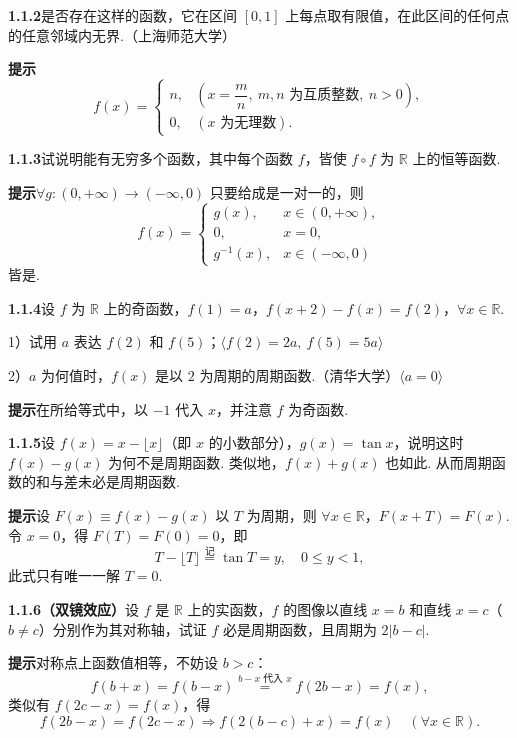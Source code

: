 \documentclass[UTF8,12pt,a4paper,fontset=fandol]{ctexart}
\begin{document}
\noindent\textbf{1.1.2}\quad 是否存在这样的函数，它在区间 $[0,1]$ 上每点取有限值，在此区间的任何点的任意邻域内无界.（上海师范大学）

\noindent\textbf{提示}\quad
\[
f(x)=
\begin{cases}
n, & \left(x=\dfrac mn,\ m,n\text{ 为互质整数},\ n>0\right),\\
0, & (x\text{ 为无理数}).
\end{cases}
\]

\noindent\textbf{1.1.3}\quad 试说明能有无穷多个函数，其中每个函数 $f$，皆使 $f\circ f$ 为 $\mathbb{R}$ 上的恒等函数.

\noindent\textbf{提示}\quad $\forall g:(0,+\infty)\to(-\infty,0)$ 只要给成是一对一的，则
\[
f(x)=
\begin{cases}
g(x), & x\in(0,+\infty),\\
0, & x=0,\\
g^{-1}(x), & x\in(-\infty,0)
\end{cases}
\]
皆是.

\noindent\textbf{1.1.4}\quad 设 $f$ 为 $\mathbb{R}$ 上的奇函数，$f(1)=a$，$f(x+2)-f(x)=f(2)$，$\forall x\in\mathbb{R}$.

1）试用 $a$ 表达 $f(2)$ 和 $f(5)$；\hfill $\langle f(2)=2a,\ f(5)=5a\rangle$

2）$a$ 为何值时，$f(x)$ 是以 $2$ 为周期的周期函数.（清华大学）\hfill $\langle a=0\rangle$

\noindent\textbf{提示}\quad 在所给等式中，以 $-1$ 代入 $x$，并注意 $f$ 为奇函数.

\noindent\textbf{1.1.5}\quad 设 $f(x)=x-\lfloor x\rfloor$（即 $x$ 的小数部分），$g(x)=\tan x$，说明这时 $f(x)-g(x)$ 为何不是周期函数. 类似地，$f(x)+g(x)$ 也如此. 从而周期函数的和与差未必是周期函数.

\noindent\textbf{提示}\quad 设 $F(x)\equiv f(x)-g(x)$ 以 $T$ 为周期，则 $\forall x\in\mathbb{R}$，$F(x+T)=F(x)$. 令 $x=0$，得 $F(T)=F(0)=0$，即
\[
  T-\lfloor T\rfloor\stackrel{\text{记}}{=}\tan T=y,\quad 0\le y<1,
\]
此式只有唯一一解 $T=0$.

\noindent\textbf{1.1.6（双镜效应）}\quad 设 $f$ 是 $\mathbb{R}$ 上的实函数，$f$ 的图像以直线 $x=b$ 和直线 $x=c$（$b\ne c$）分别作为其对称轴，试证 $f$ 必是周期函数，且周期为 $2|b-c|$.

\noindent\textbf{提示}\quad 对称点上函数值相等，不妨设 $b>c$：
\[
  f(b+x)=f(b-x)\overset{b-x\text{ 代入 }x}{=} f(2b-x)=f(x),
\]
类似有 $f(2c-x)=f(x)$，得
\[
  f(2b-x)=f(2c-x)\Rightarrow f(2(b-c)+x)=f(x)\quad(\forall x\in\mathbb{R}).
\]
\end{document}
